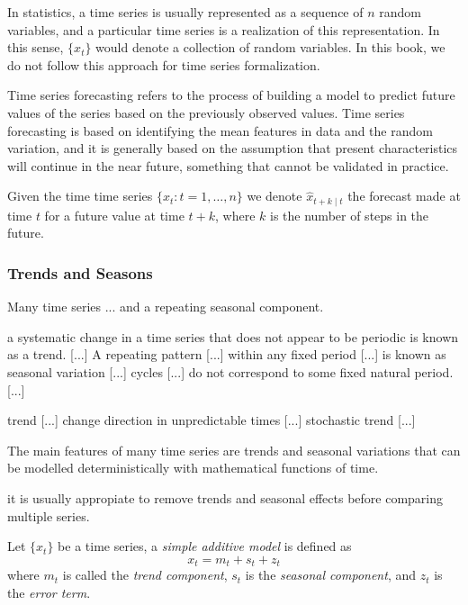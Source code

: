 In statistics, a time series is usually represented as a sequence of $n$ random variables, and a particular time series is a realization of this representation. In this sense, $\{ x_t \}$ would denote a collection of random variables. In this book, we do not follow this approach for time series formalization.

Time series forecasting refers to the process of building a model to predict future values of the series based on the previously observed values. Time series forecasting is based on identifying the mean features in data and the random variation, and it is generally based on the assumption that present characteristics will continue in the near future, something that cannot be validated in practice.

\begin{notation}
Given the time time series $\{ x_t : t=1, \ldots, n \}$ we denote $\hat{x}_{t+k \mid t}$ the forecast made at time $t$ for a future value at time $t+k$, where $k$ is the number of steps in the future.
\end{notation}

\subsubsection{Trends and Seasons}

Many time series ... and a repeating seasonal component.

{\color{red} a systematic change in a time series that does not appear to be periodic is known as a trend. [...] A repeating pattern [...] within any fixed period [...] is known as seasonal variation [...] cycles [...] do not correspond to some fixed natural period. [...]}

{\color{red} trend [...] change direction in unpredictable times [...] stochastic trend [...]}

{\color{red} The main features of many time series are trends and seasonal variations that can be modelled deterministically with mathematical functions of time.}

{\color{red} it is usually appropiate to remove trends and seasonal effects before comparing multiple series.}

\begin{definition}
    Let $\{ x_t \}$ be a time series, a \emph{simple additive model} is defined as
    \[
        x_t = m_t + s_t + z_t
    \]
    where $m_t$ is called the \emph{trend component}, $s_t$ is the \emph{seasonal component}, and $z_t$ is the \emph{error term}.
\end{definition}

